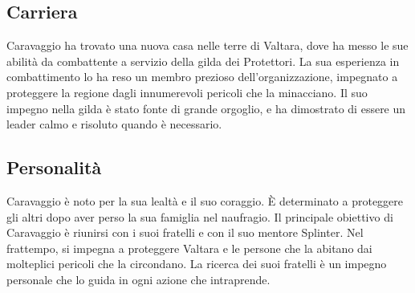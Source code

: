 \subsection{Carriera}\label{carriera}


Caravaggio ha trovato una nuova casa nelle terre di Valtara, dove ha
messo le sue abilità da combattente a servizio della gilda dei
Protettori. La sua esperienza in combattimento lo ha reso un membro
prezioso dell'organizzazione, impegnato a proteggere la regione dagli
innumerevoli pericoli che la minacciano. Il suo impegno nella gilda è
stato fonte di grande orgoglio, e ha dimostrato di essere un leader
calmo e risoluto quando è necessario.

\subsection{Personalità}\label{personalituxe0}


Caravaggio è noto per la sua lealtà e il suo coraggio. È determinato a
proteggere gli altri dopo aver perso la sua famiglia nel naufragio. Il
principale obiettivo di Caravaggio è riunirsi con i suoi fratelli e con
il suo mentore Splinter. Nel frattempo, si impegna a proteggere Valtara
e le persone che la abitano dai molteplici pericoli che la circondano.
La ricerca dei suoi fratelli è un impegno personale che lo guida in ogni
azione che intraprende.

